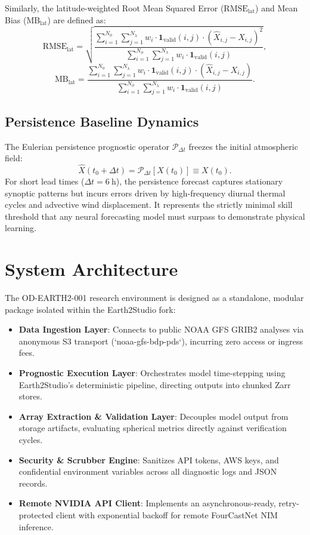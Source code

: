 \documentclass[10pt,journal,compsoc]{IEEEtran}
\begin{document}
Similarly, the latitude-weighted Root Mean Squared Error ($\text{RMSE}_{\text{lat}}$) and Mean Bias ($\text{MB}_{\text{lat}}$) are defined as:
\begin{equation}
    \text{RMSE}_{\text{lat}} = \sqrt{ \frac{\sum_{i=1}^{N_\phi} \sum_{j=1}^{N_\lambda} w_i \cdot \mathbf{1}_{\text{valid}}(i,j) \cdot (\hat{X}_{i,j} - X_{i,j})^2}{\sum_{i=1}^{N_\phi} \sum_{j=1}^{N_\lambda} w_i \cdot \mathbf{1}_{\text{valid}}(i,j)} },
\end{equation}
\begin{equation}
    \text{MB}_{\text{lat}} = \frac{\sum_{i=1}^{N_\phi} \sum_{j=1}^{N_\lambda} w_i \cdot \mathbf{1}_{\text{valid}}(i,j) \cdot (\hat{X}_{i,j} - X_{i,j})}{\sum_{i=1}^{N_\phi} \sum_{j=1}^{N_\lambda} w_i \cdot \mathbf{1}_{\text{valid}}(i,j)}.
\end{equation}

\subsection{Persistence Baseline Dynamics}
The Eulerian persistence prognostic operator $\mathcal{P}_{\Delta t}$ freezes the initial atmospheric field:
\begin{equation}
    \hat{X}(t_0 + \Delta t) = \mathcal{P}_{\Delta t}[X(t_0)] \equiv X(t_0).
\end{equation}
For short lead times ($\Delta t = \SI{6}{\hour}$), the persistence forecast captures stationary synoptic patterns but incurs errors driven by high-frequency diurnal thermal cycles and advective wind displacement. It represents the strictly minimal skill threshold that any neural forecasting model must surpass to demonstrate physical learning.

\section{System Architecture}

The OD-EARTH2-001 research environment is designed as a standalone, modular package isolated within the Earth2Studio fork:
\begin{itemize}
    \item \textbf{Data Ingestion Layer}: Connects to public NOAA GFS GRIB2 analyses via anonymous S3 transport (`noaa-gfs-bdp-pds`), incurring zero access or ingress fees.
    \item \textbf{Prognostic Execution Layer}: Orchestrates model time-stepping using Earth2Studio's deterministic pipeline, directing outputs into chunked Zarr stores.
    \item \textbf{Array Extraction \& Validation Layer}: Decouples model output from storage artifacts, evaluating spherical metrics directly against verification cycles.
    \item \textbf{Security \& Scrubber Engine}: Sanitizes API tokens, AWS keys, and confidential environment variables across all diagnostic logs and JSON records.
    \item \textbf{Remote NVIDIA API Client}: Implements an asynchronous-ready, retry-protected client with exponential backoff for remote FourCastNet NIM inference.
\end{itemize}
\end{document}
